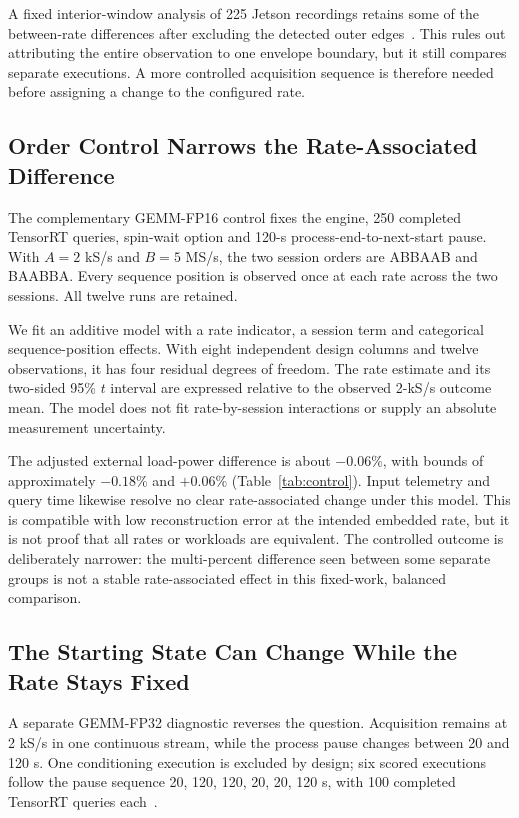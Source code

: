 A fixed interior-window analysis of 225 Jetson recordings retains some of the between-rate differences after excluding the detected outer edges~\cite{energyResults2026}. This rules out attributing the entire observation to one envelope boundary, but it still compares separate executions. A more controlled acquisition sequence is therefore needed before assigning a change to the configured rate.

\subsection{Order Control Narrows the Rate-Associated Difference}
The complementary GEMM-FP16 control fixes the engine, 250 completed TensorRT queries, spin-wait option and 120-s process-end-to-next-start pause. With $A=2$ kS/s and $B=5$ MS/s, the two session orders are ABBAAB and BAABBA. Every sequence position is observed once at each rate across the two sessions. All twelve runs are retained.

We fit an additive model with a rate indicator, a session term and categorical sequence-position effects. With eight independent design columns and twelve observations, it has four residual degrees of freedom. The rate estimate and its two-sided 95\% $t$ interval are expressed relative to the observed 2-kS/s outcome mean. The model does not fit rate-by-session interactions or supply an absolute measurement uncertainty.

\begin{table}[t]
\caption{Fixed-work FP16 rate control: adjusted 5-MS/s-minus-2-kS/s changes. The two final columns give the lower and upper model-based 95\% bounds. Six executions are measured at each rate; the intervals are not equivalence limits.}
\label{tab:control}
\centering\footnotesize
\end{table}

The adjusted external load-power difference is about $-0.06\%$, with bounds of approximately $-0.18\%$ and $+0.06\%$ (Table~\ref{tab:control}). Input telemetry and query time likewise resolve no clear rate-associated change under this model. This is compatible with low reconstruction error at the intended embedded rate, but it is not proof that all rates or workloads are equivalent. The controlled outcome is deliberately narrower: the multi-percent difference seen between some separate groups is not a stable rate-associated effect in this fixed-work, balanced comparison.

\subsection{The Starting State Can Change While the Rate Stays Fixed}
A separate GEMM-FP32 diagnostic reverses the question. Acquisition remains at 2 kS/s in one continuous stream, while the process pause changes between 20 and 120 s. One conditioning execution is excluded by design; six scored executions follow the pause sequence 20, 120, 120, 20, 20, 120 s, with 100 completed TensorRT queries each~\cite{pauseEvidence2026}.

